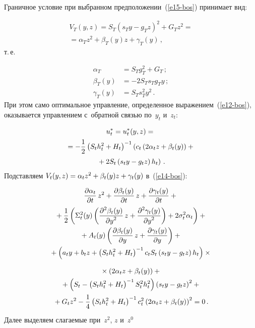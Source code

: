 \begin{multicols}{2}
     Граничное условие при выбранном предположении~(\ref{e15-bos}) 
принимает вид:

\noindent
     \begin{multline*}
     V_T(y,z)= S_T\left( s_T y- g_T z\right)^2+G_T z^2 ={}\\[-0.5pt]
     {}=\alpha_T z^2 
+\beta_T(y) z +\gamma_T(y)\,,
    \end{multline*}
т.\,е.

\noindent
\begin{align*}
\alpha_T&= S_T g_T^2 +G_T\,;\\[-0.5pt]
\beta_T(y)&=-2S_T s_T g_T y\,;\\[-0.5pt]
\gamma_T(y)&=S_T s_T^2 y^2\,.
\end{align*}
          При этом само оптимальное управ\-ле\-ние, определенное 
выражением~(\ref{e12-bos}), оказывается управ\-ле\-ни\-ем с~обратной связью 
по~$y_t$ и~$z_t$:

\noindent
     \begin{multline}
     u_t^*=u_t^*(y,z) ={}\\[-0.5pt]
     {}=
     -\displaystyle\frac{\displaystyle 1\mathstrut}{\displaystyle 2\mathstrut}\left( S_t h_t^2 +H_t\right)^{-1}
     \left( c_t \left( 2\alpha_t z +\beta_t(y)\right) +{}\right.\\[-0.5pt]
    \left. {}+2S_t\left( s_t y-g_t z\right) 
h_t\right)\,.
     \label{e17-bos}
     \end{multline}
          Подставляем $V_t(y,z)\hm= \alpha_t z^2 \hm+ \beta_t(y) 
z\hm+\gamma_t(y)$ в~(\ref{e14-bos}):

\noindent
     \begin{multline*}
     \displaystyle\frac{\displaystyle \partial \alpha_t\mathstrut}{\displaystyle \partial t\mathstrut}\, z^2 +
     \displaystyle\frac{\displaystyle \partial \beta_t(y)\mathstrut}{\displaystyle \partial t\mathstrut}\,z +
     \displaystyle\frac{\displaystyle \partial \gamma_t(y)\mathstrut}{\displaystyle \partial t\mathstrut}+{}\\[-0.5pt]
     {}+\displaystyle\frac{\displaystyle 1\mathstrut}{\displaystyle 2\mathstrut}\left( \Sigma_t^2(y) \left( 
\displaystyle\frac{\displaystyle \partial^2\beta_t(y)\mathstrut}{\displaystyle \partial y^2\mathstrut}\,z +\displaystyle\frac{\displaystyle \partial^2 \gamma_t(y)\mathstrut}{\displaystyle \partial 
y^2\mathstrut}\right) +2\sigma_t^2\alpha_t\right)+{}\\[-0.5pt]
 {}+A_t(y)\left(\displaystyle\frac{\displaystyle \partial \beta_t(y)\mathstrut}{\displaystyle \partial y\mathstrut}\,z + \displaystyle\frac{\displaystyle \partial 
\gamma_t(y)\mathstrut}{\displaystyle \partial y\mathstrut}\right) +{}\\[-0.5pt]
\hspace*{-0.22987pt}{}+\left( a_t y+b_t z+\left( S_t h_t^2 +H_t\right)^{-1} c_t S_t \left( s_t y-
g_t z\right) h_t\right)\times{}
\end{multline*}

\noindent
\begin{multline*}
         {}\times \left( 2\alpha_t z+\beta_t(y)\right)+{}\\
     {}+\left( S_t-\left( S_t h_t^2 +H_t\right)^{-1} S_t^2 h_t^2\right)\left( s_t y-
g_t z\right)^2+{}\\
     {}+ G_t z^2 -\displaystyle\frac{\displaystyle 1\mathstrut}{\displaystyle 4\mathstrut}\left( S_t h_t^2 +H_t\right)^{-1} c_t^2 \left( 
2\alpha_t z+\beta_t(y)\right)^2=0\,.
     \end{multline*}
          Далее выделяем слагаемые при~$z^2$, $z$ и~$z^0$
          

\end{multicols}
